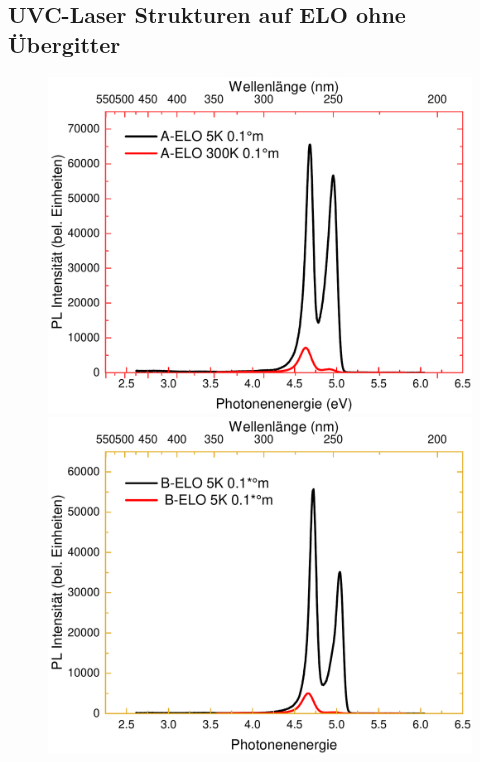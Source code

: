 \subsection{UVC-Laser Strukturen auf ELO ohne Übergitter}
%
\begin{figure}[htb]
  \centering
  \begin{minipage}[t]{0.30\textwidth}
    \centering
    \includegraphics[width=\textwidth]{Bilder/TS4045/aelo.pdf}
  \end{minipage}
	\hfill
  \begin{minipage}[t]{0.30\textwidth}
    \centering
    \includegraphics[width=\linewidth]{Bilder/TS4045/belo.pdf}

\end{minipage}
\end{figure}
